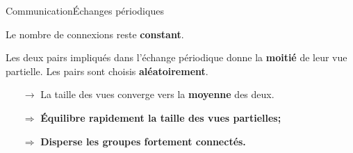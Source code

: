 \begin{frame}{Communication}{Échanges périodiques}
 
  Le nombre de connexions reste \textbf{constant}.
 
  \vspace{0.5cm}

  Les deux pairs impliqués dans l'échange périodique donne la \textbf{moitié} de
  leur vue partielle. Les pairs sont choisis \textbf{aléatoirement}.
  \begin{itemize}
  \item [$\rightarrow$] La taille des vues converge vers la \textbf{moyenne} des
    deux.
  \end{itemize}
  

  \vspace{0.5cm}\hspace{-1cm}
  \begin{minipage}{0.32\textwidth}
    \begin{center}
      
    \end{center}
  \end{minipage}
  \hspace{0.35cm}
  \begin{minipage}{0.32\textwidth}
    \begin{center}
      
    \end{center}
  \end{minipage}
  \hspace{0.35cm}
  \begin{minipage}{0.32\textwidth}
    \begin{center}
      
    \end{center}
  \end{minipage}

  \vspace{0.5cm}
  \large
  \begin{itemize}
  \item [$\Rightarrow$] \textbf{Équilibre rapidement la taille des vues
      partielles;}
  \item [$\Rightarrow$] \textbf{Disperse les groupes fortement connectés.}
  \end{itemize}
  
\end{frame}


